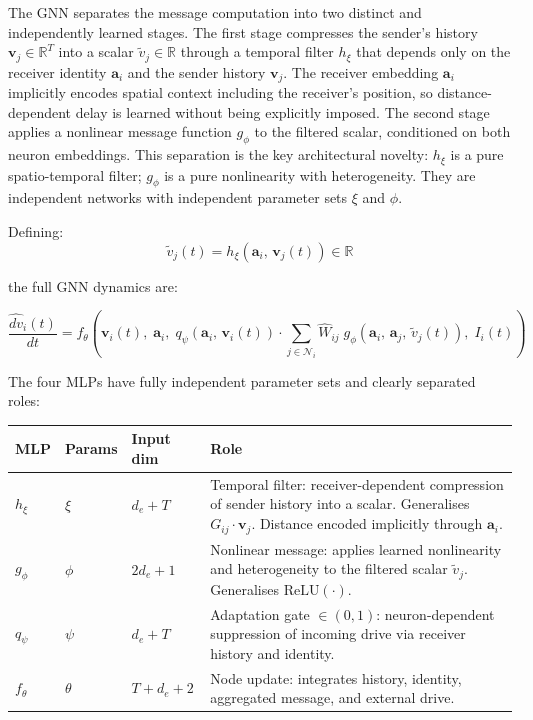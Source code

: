 \documentclass[11pt]{article}
\begin{document}
The GNN separates the message computation into two distinct and
independently learned stages. The first stage compresses the sender's
history $\mathbf{v}_j \in \mathbb{R}^T$ into a scalar $\tilde{v}_j \in \mathbb{R}$
through a temporal filter $h_\xi$ that depends only on the receiver
identity $\mathbf{a}_i$ and the sender history $\mathbf{v}_j$.
The receiver embedding $\mathbf{a}_i$ implicitly encodes spatial context
including the receiver's position, so distance-dependent delay is learned
without being explicitly imposed. The second stage applies a nonlinear
message function $g_\phi$ to the filtered scalar, conditioned on both
neuron embeddings. This separation is the key architectural novelty:
$h_\xi$ is a pure spatio-temporal filter; $g_\phi$ is a pure nonlinearity
with heterogeneity. They are independent networks with independent
parameter sets $\xi$ and $\phi$.

Defining:
\begin{equation}
\tilde{v}_j(t) = h_\xi\!\left(\mathbf{a}_i,\,\mathbf{v}_j(t)\right) \in \mathbb{R}
\end{equation}

the full GNN dynamics are:

\begin{equation}
\boxed{
\frac{\widehat{dv}_i(t)}{dt}
= f_\theta\!\left(
\mathbf{v}_i(t),\;\mathbf{a}_i,\;
q_\psi\!\left(\mathbf{a}_i,\,\mathbf{v}_i(t)\right)
\cdot \sum_{j\in\mathcal{N}_i}
\hat{W}_{ij}\;
g_\phi\!\left(\mathbf{a}_i,\,\mathbf{a}_j,\,\tilde{v}_j(t)\right),\;
I_i(t)
\right)
}
\label{eq:gnn_new}
\end{equation}

The four MLPs have fully independent parameter sets and clearly separated
roles:

\begin{center}
\begin{tabular}{lllp{5.8cm}}
\toprule
MLP & Params & Input dim & Role \\
\midrule
$h_\xi$ & $\xi$ & $d_e + T$ &
  Temporal filter: receiver-dependent compression of sender history
  into a scalar. Generalises $G_{ij} \cdot \mathbf{v}_j$.
  Distance encoded implicitly through $\mathbf{a}_i$. \\
$g_\phi$ & $\phi$ & $2d_e + 1$ &
  Nonlinear message: applies learned nonlinearity and heterogeneity
  to the filtered scalar $\tilde{v}_j$. Generalises $\mathrm{ReLU}(\cdot)$. \\
$q_\psi$ & $\psi$ & $d_e + T$ &
  Adaptation gate $\in(0,1)$: neuron-dependent suppression
  of incoming drive via receiver history and identity. \\
$f_\theta$ & $\theta$ & $T + d_e + 2$ &
  Node update: integrates history, identity, aggregated
  message, and external drive. \\
\bottomrule
\end{tabular}
\end{center}
\end{document}
